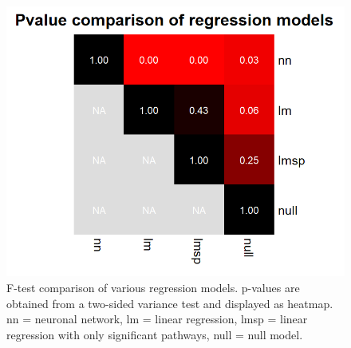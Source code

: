\documentclass[
]{article}
\begin{document}
\begin{figure}

{\centering \includegraphics[width=0.3\linewidth]{figures/Regression comparison Pvalues IL36 genes} 

}

\caption{F-test comparison of various regression models. p-values are obtained from a two-sided variance test and displayed as heatmap. nn = neuronal network, lm = linear regression, lmsp = linear regression with only significant pathways, null = null model.}\label{fig:pval}
\end{figure}
\end{document}
